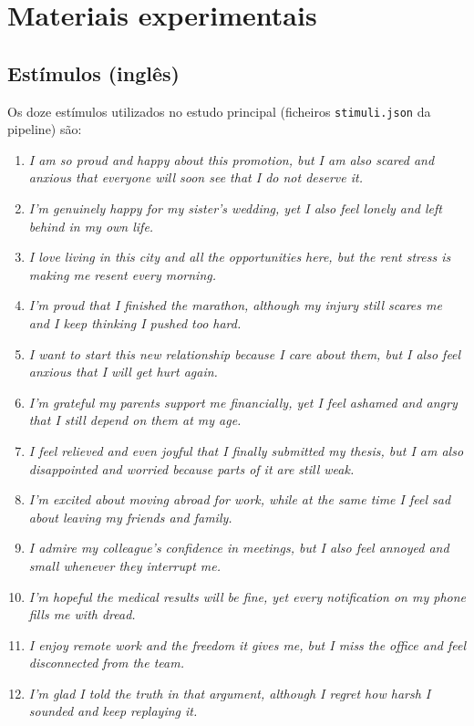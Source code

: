 
\chapter{Materiais experimentais}
\label{AppendixA}

\section{Estímulos (inglês)}

Os doze estímulos utilizados no estudo principal (ficheiros \texttt{stimuli.json} da pipeline) são:

\begin{enumerate}
 \item \textit{I am so proud and happy about this promotion, but I am also scared and anxious that everyone will soon see that I do not deserve it.}
 \item \textit{I'm genuinely happy for my sister's wedding, yet I also feel lonely and left behind in my own life.}
 \item \textit{I love living in this city and all the opportunities here, but the rent stress is making me resent every morning.}
 \item \textit{I'm proud that I finished the marathon, although my injury still scares me and I keep thinking I pushed too hard.}
 \item \textit{I want to start this new relationship because I care about them, but I also feel anxious that I will get hurt again.}
 \item \textit{I'm grateful my parents support me financially, yet I feel ashamed and angry that I still depend on them at my age.}
 \item \textit{I feel relieved and even joyful that I finally submitted my thesis, but I am also disappointed and worried because parts of it are still weak.}
 \item \textit{I'm excited about moving abroad for work, while at the same time I feel sad about leaving my friends and family.}
 \item \textit{I admire my colleague's confidence in meetings, but I also feel annoyed and small whenever they interrupt me.}
 \item \textit{I'm hopeful the medical results will be fine, yet every notification on my phone fills me with dread.}
 \item \textit{I enjoy remote work and the freedom it gives me, but I miss the office and feel disconnected from the team.}
 \item \textit{I'm glad I told the truth in that argument, although I regret how harsh I sounded and keep replaying it.}
\end{enumerate}

